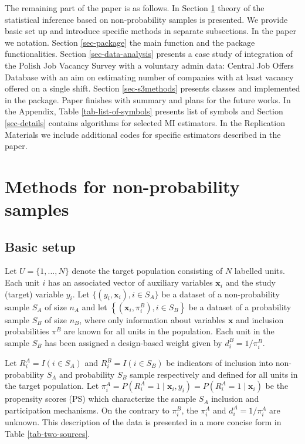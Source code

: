 \documentclass[
]{jss}
\begin{document}
The remaining part of the paper is as follows. In Section
\ref{sec-methods} theory of the statistical inference based on
non-probability samples is presented. We provide basic set up and
introduce specific methods in separate subsections. In the paper we
\citet{wu2022statistical} notation. Section \ref{sec-package} the main
function and the package functionalities. Section
\ref{sec-data-analysis} presents a case study of integration of the
Polish Job Vacancy Survey with a voluntary admin data: Central Job
Offers Database with an aim on estimating number of companies with at
least vacancy offered on a single shift. Section \ref{sec-s3methods}
presents classes and  implemented in the package. Paper
finishes with summary and plans for the future works. In the Appendix,
Table \ref{tab-list-of-symbols} presents list of symbols and Section
\ref{sec-details} contains algorithms for selected MI estimators. In the
Replication Materials we include additional codes for specific
estimators described in the paper.

\section{Methods for non-probability samples}\label{sec-methods}

\subsection{Basic setup}\label{basic-setup}

Let \(U=\{1,..., N\}\) denote the target population consisting of \(N\)
labelled units. Each unit \(i\) has an associated vector of auxiliary
variables \(\boldsymbol{x}_{i}\) and the study (target) variable
\(y_{i}\). Let \(\{ (y_i, \boldsymbol{x}_i), i \in S_A\}\) be a dataset
of a non-probability sample \(S_A\) of size \(n_A\) and let
\(\left\{\left(\boldsymbol{x}_i, \pi_{i}^B\right), i \in S_B\right\}\)
be a dataset of a probability sample \(S_B\) of size \(n_B\), where only
information about variables \(\boldsymbol{x}\) and inclusion
probabilities \(\pi^B\) are known for all units in the population. Each
unit in the sample \(S_B\) has been assigned a design-based weight given
by \(d_i^B = 1/\pi_i^B\).

Let \(R_i^A=I(i \in S_A)\) and \(R_i^B=I(i \in S_B)\) be indicators of
inclusion into non-probability \(S_A\) and probability \(S_B\) sample
respectively and defined for all units in the target population. Let
\(\pi_i^A=P(R_i^A=1 \mid \boldsymbol{x}_i, y_i)=P(R_i^A=1 \mid \boldsymbol{x}_i)\)
be the propensity scores (PS) which characterize the sample \(S_A\)
inclusion and participation mechanisms. On the contrary to \(\pi_i^B\),
the \(\pi_i^A\) and \(d_i^A=1/\pi_i^A\) are unknown. This description of
the data is presented in a more concise form in Table
\ref{tab-two-sources}.
\end{document}
